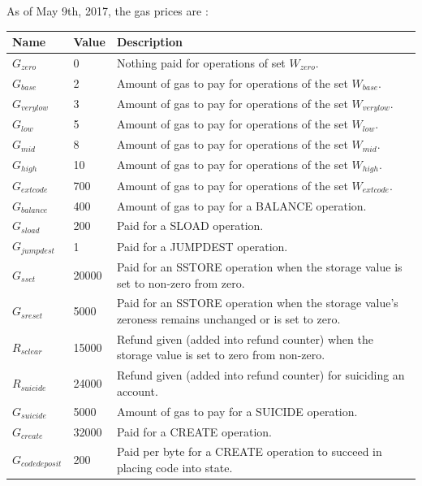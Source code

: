\documentclass{article}
\begin{document}
		As of May 9th, 2017, the gas prices are \cite{yellow-paper}: 
		\begin{table}[!ht]
		\footnotesize
		\noindent \begin{tabular}{| l | l | p{8cm} |}
			\hline
			Name 				& Value 	& Description \\ \hline
			$G_{zero}$ 			& 0 		& Nothing paid for operations of set $W_{zero}$. \\ \hline
			$G_{base}$ 			& 2 		& Amount of gas to pay for operations of the set $W_{base}$. \\ \hline
			$G_{verylow}$ 		& 3 		& Amount of gas to pay for operations of the set $W_{verylow}$. \\ \hline
			$G_{low}$ 			& 5 		& Amount of gas to pay for operations of the set $W_{low}$. \\ \hline
			$G_{mid}$ 			& 8 		& Amount of gas to pay for operations of the set $W_{mid}$. \\ \hline
			$G_{high}$ 			& 10 		& Amount of gas to pay for operations of the set $W_{high}$. \\ \hline
			$G_{extcode}$ 		& 700 		& Amount of gas to pay for operations of the set $W_{extcode}$. \\ \hline
			$G_{balance}$ 		& 400 		& Amount of gas to pay for a BALANCE operation. \\ \hline
			$G_{sload}$ 		& 200 		& Paid for a SLOAD operation. \\ \hline
			$G_{jumpdest}$ 		& 1 		& Paid for a JUMPDEST operation. \\ \hline
			$G_{sset}$ 			& 20000 	& Paid for an SSTORE operation when the storage value is set to non-zero from zero. \\ \hline
			$G_{sreset}$ 		& 5000 		& Paid for an SSTORE operation when the storage value's zeroness remains unchanged or is set to zero. \\ \hline
			$R_{sclear}$ 		& 15000		& Refund given (added into refund counter) when the storage value is set to zero from non-zero. \\ \hline
			$R_{suicide}$ 		& 24000 	& Refund given (added into refund counter) for suiciding an account. \\ \hline
			$G_{suicide}$ 		& 5000 		& Amount of gas to pay for a SUICIDE operation. \\ \hline
			$G_{create}$ 		& 32000		& Paid for a CREATE operation. \\ \hline
			$G_{codedeposit}$ 	& 200 		& Paid per byte for a CREATE operation to succeed in placing code into state. \\ \hline

\end{tabular}
\end{table}
\end{document}
